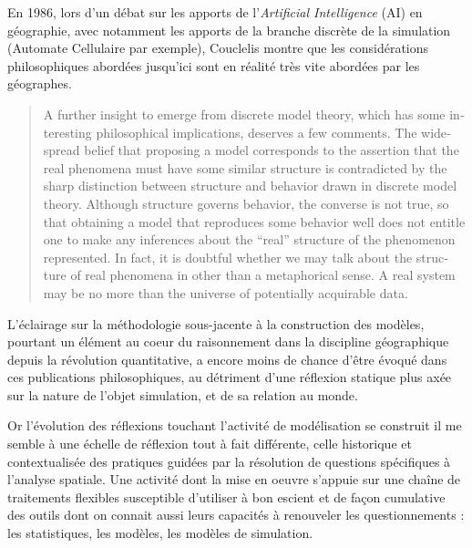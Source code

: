 En 1986, lors d'un débat sur les apports de l'\textit{Artificial Intelligence} (AI) en géographie, avec notamment les apports de la branche discrète de la simulation (Automate Cellulaire par exemple), Couclelis montre que les considérations philosophiques abordées jusqu'ici sont en réalité très vite abordées par les géographes.

\foreignblockquote{english}[\cite{Couclelis1986}]{A further insight to emerge from discrete model theory, which has some interesting philosophical implications, deserves a few comments. The widespread belief that proposing a model corresponds to the assertion that the real phenomena must have some similar structure is contradicted by the sharp distinction between structure and behavior drawn in discrete model theory. Although structure governs behavior, the converse is not true, so that obtaining a model that reproduces some behavior well does not entitle one to make any inferences about the \enquote{real} structure of the phenomenon represented. In fact, it is doubtful whether we may talk about the structure of real phenomena in other than a metaphorical sense. A real system may be no more than the universe of potentially acquirable data.} 

L'éclairage sur la méthodologie sous-jacente à la construction des modèles, pourtant un élément au coeur du raisonnement dans la discipline géographique depuis la révolution quantitative, a encore moins de chance d'être évoqué dans ces publications philosophiques, au détriment d'une réflexion statique plus axée sur la nature de l'objet simulation, et de sa relation au monde.

Or l'évolution des réflexions touchant l'activité de modélisation se construit il me semble à une échelle de réflexion tout à fait différente, celle historique et  contextualisée des pratiques guidées par la résolution de questions spécifiques à l'analyse spatiale. Une activité dont la mise en oeuvre s'appuie sur une chaîne de traitements flexibles susceptible d'utiliser à bon escient et de façon cumulative des outils dont on connait aussi leurs capacités à renouveler les questionnements : les statistiques, les modèles, les modèles de simulation.



